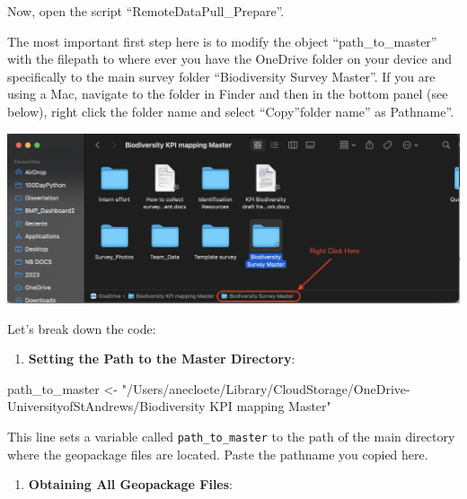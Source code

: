 \documentclass[
]{book}
\newenvironment{Shaded}{\begin{snugshade}}{\end{snugshade}}
\newcommand{\AttributeTok}[1]{\textcolor[rgb]{0.13,0.29,0.53}{#1}}
\newcommand{\ConstantTok}[1]{\textcolor[rgb]{0.56,0.35,0.01}{#1}}
\newcommand{\FunctionTok}[1]{\textcolor[rgb]{0.13,0.29,0.53}{\textbf{#1}}}
\newcommand{\NormalTok}[1]{#1}
\newcommand{\OtherTok}[1]{\textcolor[rgb]{0.56,0.35,0.01}{#1}}
\newcommand{\SpecialCharTok}[1]{\textcolor[rgb]{0.81,0.36,0.00}{\textbf{#1}}}
\newcommand{\StringTok}[1]{\textcolor[rgb]{0.31,0.60,0.02}{#1}}
\providecommand{\tightlist}{%
  \setlength{\itemsep}{0pt}\setlength{\parskip}{0pt}}
\theoremstyle{definition}
\theoremstyle{definition}
\theoremstyle{definition}
\theoremstyle{definition}
\theoremstyle{remark}
\begin{document}
Now, open the script ``RemoteDataPull\_Prepare''.

The most important first step here is to modify the object ``path\_to\_master'' with the filepath to where ever you have the OneDrive folder on your device and specifically to the main survey folder ``Biodiversity Survey Master''. If you are using a Mac, navigate to the folder in Finder and then in the bottom panel (see below), right click the folder name and select ``Copy''folder name'' as Pathname''.

\includegraphics{images/pathname_copy.png}

Let's break down the code:

\begin{enumerate}
\def\labelenumi{\arabic{enumi}.}
\tightlist
\item
  \textbf{Setting the Path to the Master Directory}:
\end{enumerate}

\begin{Shaded}
\begin{Highlighting}[]
\NormalTok{   path\_to\_master }\OtherTok{\textless{}{-}} \StringTok{"/Users/anecloete/Library/CloudStorage/OneDrive{-}UniversityofStAndrews/Biodiversity KPI mapping Master"}
\end{Highlighting}
\end{Shaded}

This line sets a variable called \texttt{path\_to\_master} to the path of the main directory where the geopackage files are located. Paste the pathname you copied here.

\begin{enumerate}
\def\labelenumi{\arabic{enumi}.}
\setcounter{enumi}{1}
\tightlist
\item
  \textbf{Obtaining All Geopackage Files}:
\end{enumerate}

\begin{Shaded}
\end{Shaded}
\end{document}
